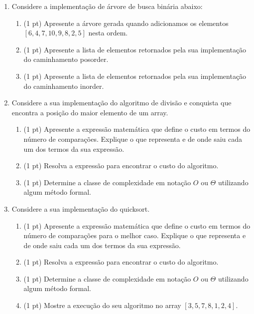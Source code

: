 \documentclass{article}
\begin{document}
\begin{enumerate}
    
    \item Considere a implementação de árvore de busca binária abaixo:
        

        \begin{enumerate}
            \item (1 pt) Apresente a árvore gerada quando adicionamos os elementos $[6,4,7,10,9,8,2,5]$ nesta ordem.
            \item (1 pt) Apresente a lista de elementos retornados pela sua implementação do caminhamento posorder.
            \item (1 pt) Apresente a lista de elementos retornados pela sua implementação do caminhamento inorder.
        \end{enumerate}

    \item Considere a sua implementação do algoritmo de divisão e conquista que encontra a posição do maior elemento de um array.
    \begin{enumerate}
        \item (1 pt) Apresente a expressão matemática que define o custo em termos do número de comparações. Explique o que representa e de onde saiu cada um dos termos da sua expressão. 
        \item (1 pt) Resolva a expressão para encontrar o custo do algoritmo.
        \item (1 pt) Determine a classe de complexidade em notação $O$ ou $\Theta$ utilizando algum método formal. 
    \end{enumerate}

    \item Considere a sua implementação do quicksort.
    \begin{enumerate}
        \item (1 pt) Apresente a expressão matemática que define o custo em termos do número de comparações para o melhor caso. Explique o que representa e de onde saiu cada um dos termos da sua expressão. 
        \item (1 pt) Resolva a expressão para encontrar o custo do algoritmo.
        \item (1 pt) Determine a classe de complexidade em notação $O$ ou $\Theta$ utilizando algum método formal.
        \item (1 pt) Mostre a execução do seu algoritmo no array $[3,5,7,8,1,2,4]$.
    \end{enumerate}
   
\end{enumerate}



%
%
\end{document}
